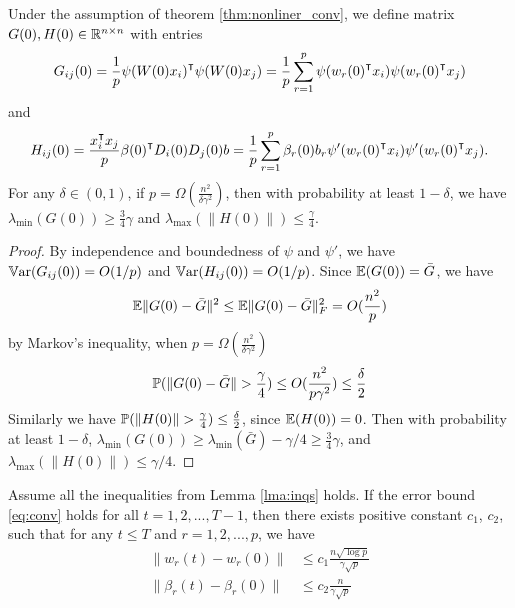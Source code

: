 \begin{lemma}
\label{lma:GH}
Under the assumption of theorem \ref{thm:nonliner_conv}, we define matrix $G(0),H(0)\in\mathbb{R}^{n\times n}$ with entries
\begin{equation}
\label{eq:def_G0}
G_{ij}(0) = \frac{1}{p}\psi(W(0)x_i)\transpose \psi(W(0)x_j) = \frac{1}{p}\sum_{r=1}^p\psi(w_r(0)\transpose x_i)\psi(w_r(0)\transpose x_j) 
\end{equation}
and 
\begin{equation}
\label{eq:def_H0}
H_{ij}(0) = \frac{x_i\transpose x_j}{p}\beta(0)\transpose D_i(0)D_j(0)b = \frac{1}{p}\sum_{r=1}^p\beta_r(0)b_r\psi'(w_r(0)\transpose x_i)\psi'(w_r(0)\transpose x_j).
\end{equation}
For any $\delta \in (0,1)$, if $p=\Omega(\frac{n^2}{\delta\gamma^2})$, then with probability at least $1-\delta$, we have $\lambda_{\min}(G(0))\geq \frac{3}{4}\gamma$ and $\lambda_{\max}(\|H(0)\|)\leq \frac{\gamma}{4}$.
\end{lemma}
\begin{proof}
By independence and boundedness of $\psi$ and $\psi'$, we have $\mathbb{V}\mathrm{ar}(G_{ij}(0)) = O(1/p)$ and $\mathbb{V}\mathrm{ar}(H_{ij}(0)) = O(1/p)$. Since $\mathbb{E}(G(0))=\bar{G}$, we have
\begin{equation*}
\mathbb{E}\|G(0)-\bar{G}\|^2 \leq \mathbb{E}\|G(0)-\bar{G}\|^2_F = O(\frac{n^2}{p})
\end{equation*}
by Markov's inequality, when $p=\Omega(\frac{n^2}{\delta\gamma^2})$
\begin{equation*}
    \prob(\|G(0)-\bar{G}\|>\frac{\gamma}{4})\leq O(\frac{n^2}{p\gamma^2})\leq\frac{\delta}{2}
\end{equation*}
Similarly we have $\prob(\|H(0)\|>\frac{\gamma}{4})\leq\frac{\delta}{2}$, since $\mathbb{E}(H(0))=0$. Then with probability at least $1-\delta$, $\lambda_{\min}(G(0)) \geq \lambda_{\min}(\bar{G}) -\gamma/4 \geq \frac{3}{4}\gamma$, and $\lambda_{\max}(\|H(0)\|)\leq \gamma/4$.
\end{proof}



\begin{lemma}
\label{lma:weights}
Assume all the inequalities from Lemma \ref{lma:inqs} holds. If the error bound \eqref{eq:conv} holds for all $t=1,2,...,T-1$, then there exists positive constant $c_1$, $c_2$, such that for any $t\leq T$ and $r=1,2,...,p$, we have 
\begin{equation}
\label{eq:weights}
\begin{aligned}
    \|w_r(t)-w_r(0)\| &\leq c_1\frac{n\sqrt{\log p}}{\gamma\sqrt p} \\
    \|\beta_r(t)-\beta_r(0)\| &\leq c_2\frac{n}{\gamma\sqrt p}
\end{aligned}
\end{equation}
\end{lemma}

